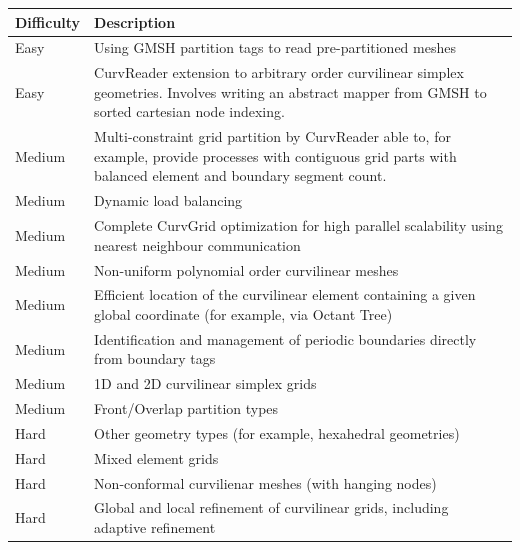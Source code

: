 \noindent
\begin{tabularx}{\textwidth}{l X}
\hline
     Difficulty & Description \\
\hline
	 Easy & Using GMSH partition tags to read pre-partitioned meshes \\
	 Easy & CurvReader extension to arbitrary order curvilinear simplex geometries. Involves writing an abstract mapper from GMSH to sorted cartesian node indexing. \\
	 Medium & Multi-constraint grid partition by CurvReader able to, for example, provide processes with contiguous grid parts with balanced element and boundary segment count. \\
	 Medium & Dynamic load balancing \\
	 Medium & Complete CurvGrid optimization for high parallel scalability using nearest neighbour communication \\
	 Medium & Non-uniform polynomial order curvilinear meshes \\
	 Medium & Efficient location of the curvilinear element containing a given global coordinate (for example, via Octant Tree) \\
	 Medium & Identification and management of periodic boundaries directly from boundary tags \\
	 Medium & 1D and 2D curvilinear simplex grids \\
	 Medium & Front/Overlap partition types \\
	 Hard & Other geometry types (for example, hexahedral geometries) \\
	 Hard & Mixed element grids \\
	 Hard & Non-conformal curvilienar meshes (with hanging nodes) \\
	 Hard & Global and local refinement of curvilinear grids, including adaptive refinement \\
\hline
\end{tabularx}



